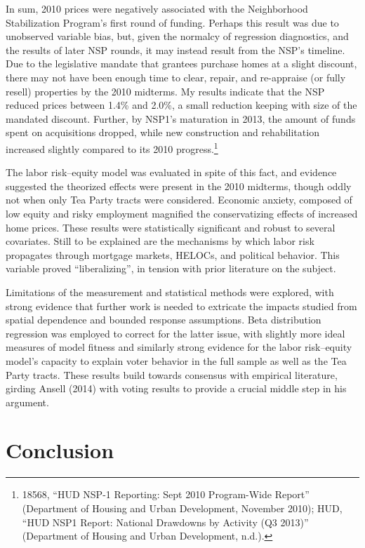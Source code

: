\documentclass[12pt,oneside]{psthesis}
\begin{document}
In sum, 2010 prices were negatively associated with the Neighborhood Stabilization Program's first round of funding.
Perhaps this result was due to unobserved variable bias, but, given the normalcy of regression diagnostics, and the results of later NSP rounds, it may instead result from the NSP's timeline.
Due to the legislative mandate that grantees purchase homes at a slight discount, there may not have been enough time to clear, repair, and re-appraise (or fully resell) properties by the 2010 midterms.
My results indicate that the NSP reduced prices between 1.4\% and 2.0\%, a small reduction keeping with size of the mandated discount.
Further, by NSP1's maturation in 2013, the amount of funds spent on acquisitions dropped, while new construction and rehabilitation increased slightly compared to its 2010 progress.\footnote{18568, ``HUD NSP-1 Reporting: Sept 2010 Program-Wide Report'' (Department of Housing and Urban Development, November 2010); HUD, ``HUD NSP1 Report: National Drawdowns by Activity (Q3 2013)'' (Department of Housing and Urban Development, n.d.).}

The labor risk--equity model was evaluated in spite of this fact, and evidence suggested the theorized effects were present in the 2010 midterms, though oddly not when only Tea Party tracts were considered.
Economic anxiety, composed of low equity and risky employment magnified the conservatizing effects of increased home prices.
These results were statistically significant and robust to several covariates.
Still to be explained are the mechanisms by which labor risk propagates through mortgage markets, HELOCs, and political behavior.
This variable proved ``liberalizing'', in tension with prior literature on the subject.

Limitations of the measurement and statistical methods were explored, with strong evidence that further work is needed to extricate the impacts studied from spatial dependence and bounded response assumptions.
Beta distribution regression was employed to correct for the latter issue, with slightly more ideal measures of model fitness and similarly strong evidence for the labor risk--equity model's capacity to explain voter behavior in the full sample as well as the Tea Party tracts.
These results build towards consensus with empirical literature, girding Ansell (2014) with voting results to provide a crucial middle step in his argument.

\hypertarget{conclusion}{%
\chapter{Conclusion}\label{conclusion}}
\end{document}
